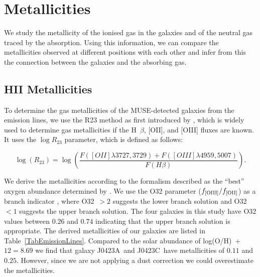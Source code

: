 \documentclass[a4paper,fleqn,usenatbib]{mnras}
\newcommand{\GalA}{J0423A}
\newcommand{\GalC}{J0423C}
\begin{document}
{%




\section{Metallicities}

We study the metallicity of the ionised gas in the galaxies and of the neutral gas traced by the absorption. Using this information, we can compare the metallicities observed at different positions with each other and infer from this the connection between the galaxies and the absorbing gas.

\subsection{HII Metallicities}
\label{SecEmLinesMetallicity}

To determine the gas metallicities of the MUSE-detected galaxies from the emission lines, we use the R23 method as first introduced by \citet{Pagel1979composition}, which is widely used to determine gas metallicities if the H~$\beta$, [OII], and [OIII] fluxes are known. It uses the $\log R_{23}$ parameter, which is defined as follows:

\begin{equation}
\log(R_{23}) = \log \left(\frac{F([OII]\lambda 3727, 3729) + F([OIII]\lambda4959, 5007)}{F(H\beta)}\right).
\end{equation}

We derive the metallicities according to the formalism described as the ``best'' oxygen abundance determined by \mbox{\citet{Kobulnick2004metallicities}}. 
We use the O32 parameter ($f_{\rm [OIII]}/f_{\rm[OII]}$) as a branch indicator \mbox{\citep{Maiolino2008amaze}}, where O32~$>2$ suggests the lower branch solution and O32~$<1$ suggests the upper branch solution. The four galaxies in this study have O32 values between $0.26$ and $0.74$ indicating that the upper branch solution is appropriate. The derived metallicities of our galaxies are listed in \mbox{Table~\ref{TabEmissionLines}}. 
Compared to the solar abundance of \mbox{log(O/H) + $12 = 8.69$} \mbox{\citep{Asplund2009chemical}} we find that galaxy \GalA\ and \GalC\ have metallicities of $0.11$ and $0.25$. However, since we are not applying a dust correction we could overestimate the metallicities.

}
\end{document}
